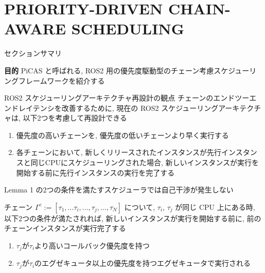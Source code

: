 
\section{PRIORITY-DRIVEN CHAIN-AWARE SCHEDULING}
\label{sec: priority-driven chain-aware scheduling}

\begin{frame}{セクションサマリ}
    \begin{itembox}[l]{\textbf{目的}}
        PiCAS と呼ばれる, ROS2 用の優先度駆動型のチェーン考慮スケジューリングフレームワークを紹介する
    \end{itembox}
\end{frame}

\begin{frame}{ROS2 スケジューリングアーキテクチャ再設計の観点}
    チェーンのエンドツーエンドレイテンシを改善するために, 現在の ROS2 スケジューリングアーキテクチャは, 以下2つを考慮して再設計できる
    \begin{enumerate}
        \item 優先度の高いチェーンを, 優先度の低いチェーンより早く実行する
        \item 各チェーンにおいて, 新しくリリースされたインスタンスが先行インスタンスと同じCPUにスケジューリングされた場合, 新しいインスタンスが実行を開始する前に先行インスタンスの実行を完了する
    \end{enumerate}
\end{frame}

\begin{frame}[label=lemma1]{Lemma 1}
     の2つの条件を満たすスケジューラでは自己干渉が発生しない
    \begin{lemma}[]
        チェーン $\Gamma^{c}:=\left[\tau_{1}, \ldots \tau_{i}, \ldots, \tau_{j}, \ldots, \tau_{N}\right]$ について, $\tau_{i}$, $\tau_{j}$ が同じ CPU 上にある時, 以下2つの条件が満たされれば, 新しいインスタンスが実行を開始する前に, 前のチェーンインスタンスが実行完了する
        \begin{enumerate}
            \item $\tau_{j}$が$\tau_{i}$より高いコールバック優先度を持つ
            \item $\tau_{j}$が$\tau_{i}$のエグゼキュータ以上の優先度を持つエグゼキュータで実行される
        \end{enumerate}
    \end{lemma}
\end{frame}

